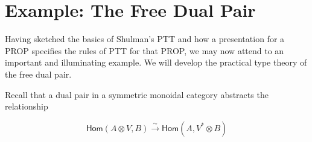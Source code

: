 \documentclass[pra,floatfix,
amsmath,superscriptaddress, 12pt]{article}
\theoremstyle{definition}
\newcommand{\liso}{\overset{\sim}{\longrightarrow}}
\newcommand{\coev}{\mathsf{coev}}
\begin{document}

\section{Example: The Free Dual Pair}\label{ex:TheFreeDualPair}


Having sketched the basics of Shulman's \textsf{PTT} and how a presentation for a \textsf{PROP} specifies the rules of \textsf{PTT} for that \textsf{PROP}, we may now attend to an important and illuminating example. We will develop the practical type theory of the free dual pair.

Recall that a dual pair in a symmetric monoidal category abstracts the relationship

\[
     \mathsf{Hom}\left(A\otimes V,B\right)\liso\mathsf{Hom}\left(A,V^{*}\otimes B\right)
\]
\end{document}
